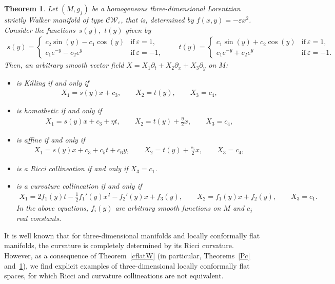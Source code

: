 \documentclass[pdftex]{sigma}
\numberwithin{equation}{section}
\newtheorem{Theorem}{Theorem}[section]
\begin{document}
\begin{Theorem}\label{CW}
Let $(M,g_f)$ be a homogeneous three-dimensional Lorentzian strictly Walker mani\-fold of type $\mathcal{CW}_\varepsilon$, that is, determined by $f(x,y)=-\varepsilon x^2$. Consider the functions~$s(y)$,~$t(y)$ given by
\begin{gather*}s(y)=
\begin{cases}
c_2\sin(y)-c_1\cos(y) & \text{if} \ \varepsilon=1, \\ c_1e^{-y}-c_2e^{y} & \text{if} \ \varepsilon=-1 ,
\end{cases} \qquad
t(y)=
 \begin{cases}
c_1\sin(y)+c_2\cos(y) & \text{if} \ \varepsilon=1, \\ c_1e^{-y}+c_2e^{y} & \text{if} \ \varepsilon=-1.
\end{cases}
\end{gather*}
Then, an arbitrary smooth vector field $X=X_1\partial_t+X_2\partial_x+X_3\partial_y$ on $M$:
\begin{itemize}\itemsep=0pt
\item is Killing if and only if
\begin{gather*}
X_1=s(y)x+c_3,\qquad X_2=t(y),\qquad X_3=c_4,
\end{gather*}
\item is homothetic if and only if
\begin{gather*}
X_1=s(y)x+c_3+\eta t,\qquad X_2=t(y)+\frac{\eta}{2}x,\qquad X_3=c_4,
\end{gather*}
\item is affine if and only if
\begin{gather*}
X_1= s(y)x+c_3+c_5t+ c_6y,\qquad X_2=t(y)+\frac{c_5}{2}x,\qquad X_3=c_4,
\end{gather*}
\item is a Ricci collineation if and only if $X_3=c_1$.

\item is a curvature collineation if and only if
\begin{gather*}
X_1=2f_1(y)t-\frac12f_1 '(y) x^2-f_2 '(y) x+f_3(y),\qquad X_2=f_1(y)x+f_2(y),\qquad X_3=c_1.
\end{gather*}
In the above {equations, $f_i(y)$ are arbitrary smooth functions on $M$ and $c_j $} real constants.
\end{itemize}
\end{Theorem}

It is well known that for three-dimensional manifolds and locally conformally f\/lat manifolds, the curvature is completely determined by its Ricci curvature. However, as a consequence of Theo\-rem~\ref{cflatW} (in particular, Theorems~\ref{Pc} and~\ref{CW}), we f\/ind explicit examples of {three-dimensional} locally conformally f\/lat spaces, for which Ricci and curvature collineations are not equivalent.
\end{document}

